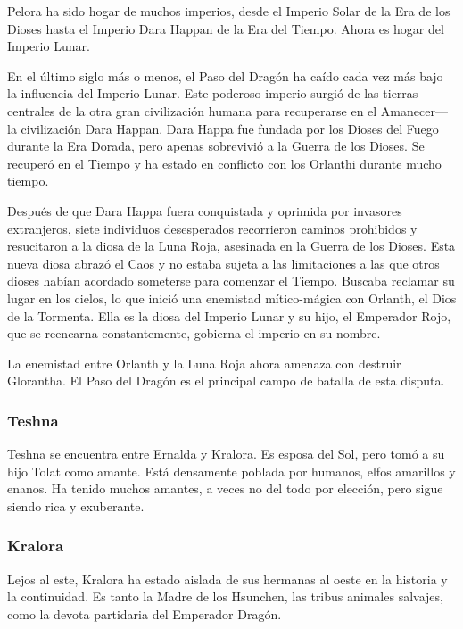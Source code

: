 Pelora ha sido hogar de muchos imperios, desde el Imperio Solar de la Era de los Dioses hasta el Imperio Dara Happan de la Era del Tiempo. Ahora es hogar del Imperio Lunar.



\begin{tcolorbox} [title=El Imperio Lunar,breakable]   
    
    En el último siglo más o menos, el Paso del Dragón ha caído cada vez más bajo la influencia del Imperio Lunar. Este poderoso imperio surgió de las tierras centrales de la otra gran civilización humana para recuperarse en el Amanecer— la civilización Dara Happan. Dara Happa fue fundada por los Dioses del Fuego durante la Era Dorada, pero apenas sobrevivió a la Guerra de los Dioses. Se recuperó en el Tiempo y ha estado en conflicto con los Orlanthi durante mucho tiempo.
	
    Después de que Dara Happa fuera conquistada y oprimida por invasores extranjeros, siete individuos desesperados recorrieron caminos prohibidos y resucitaron a la diosa de la Luna Roja, asesinada en la Guerra de los Dioses. Esta nueva diosa abrazó el Caos y no estaba sujeta a las limitaciones a las que otros dioses habían acordado someterse para comenzar el Tiempo. Buscaba reclamar su lugar en los cielos, lo que inició una enemistad mítico-mágica con Orlanth, el Dios de la Tormenta. Ella es la diosa del Imperio Lunar y su hijo, el Emperador Rojo, que se reencarna constantemente, gobierna el imperio en su nombre.
	
    La enemistad entre Orlanth y la Luna Roja ahora amenaza con destruir Glorantha. El Paso del Dragón es el principal campo de batalla de esta disputa.
\end{tcolorbox}




\subsubsection{Teshna}
Teshna se encuentra entre Ernalda y Kralora. Es esposa del Sol, pero tomó a su hijo Tolat como amante. Está densamente poblada por humanos, elfos amarillos y enanos. Ha tenido muchos amantes, a veces no del todo por elección, pero sigue siendo rica y exuberante.

\subsubsection{Kralora}
Lejos al este, Kralora ha estado aislada de sus hermanas al oeste en la historia y la continuidad. Es tanto la Madre de los Hsunchen, las tribus animales salvajes, como la devota partidaria del Emperador Dragón. 

